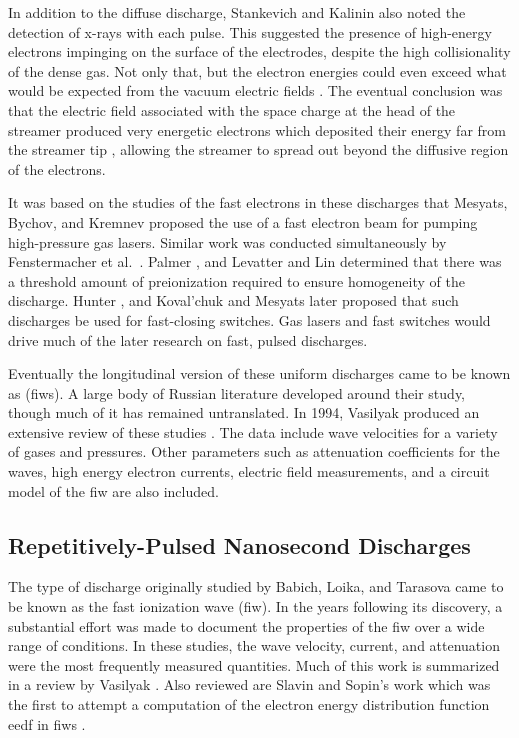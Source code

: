 In addition to the diffuse discharge, Stankevich and Kalinin also noted the
detection of x-rays with each pulse. This suggested the presence of high-energy
electrons impinging on the surface of the electrodes, despite the high
collisionality of the dense gas. Not only that, but the electron energies could
even exceed what would be expected from the vacuum electric fields
\cite{Babich1977}. The eventual conclusion was that the electric field
associated with the space charge at the head of the streamer produced very
energetic electrons which deposited their energy far from the streamer tip
\cite{Kunhardt1980, Babich1990}, allowing the streamer to spread out beyond the
diffusive region of the electrons.

It was based on the studies of the fast electrons in these discharges that
Mesyats, Bychov, and Kremnev proposed the use of a fast electron beam for
pumping high-pressure gas lasers. Similar work was conducted simultaneously by
Fenstermacher et al.~\cite{Fenstermacher1972}. Palmer \cite{Palmer1974}, and
Levatter and Lin \cite{Levatter1980} determined that there was a threshold
amount of preionization required to ensure homogeneity of the discharge. Hunter
\cite{Hunter1976}, and Koval'chuk and Mesyats \cite{Koval'chuk1976} later
proposed that such discharges be used for fast-closing switches. Gas lasers
\cite{Liu1973, Liberman1974, Pack1977, Kushner1983, Shimada1985} and fast
switches would drive much of the later research on fast, pulsed discharges.



Eventually the longitudinal version of these uniform discharges came to be known
as (\acs{fiw}s). A large body of Russian literature developed around their
study, though much of it has remained untranslated. In 1994, Vasilyak produced
an extensive review of these studies \cite{Vasilyak1994}. The data include wave
velocities for a variety of gases and pressures. Other parameters such as
attenuation coefficients for the waves, high energy electron currents, electric
field measurements, and a circuit model of the \acs{fiw} are also included.

\subsection{Repetitively-Pulsed Nanosecond Discharges}

The type of discharge originally studied by Babich, Loika, and Tarasova came to
be known as the fast ionization wave (\acs{fiw}). In the years following its
discovery, a substantial effort was made to document the properties of the
\acs{fiw} over a wide range of conditions. In these studies, the wave velocity,
current, and attenuation were the most frequently measured quantities. Much of
this work is summarized in a review by Vasilyak \cite{Vasilyak1994}. Also
reviewed are Slavin and Sopin's work which was the first to attempt a
computation of the electron energy distribution function \acs{eedf} in
\acs{fiw}s \cite{Slavin1992}.

